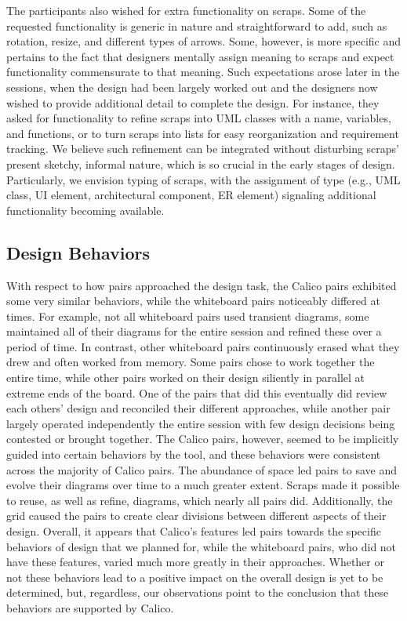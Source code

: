 The participants also wished for extra functionality on scraps. Some of the requested functionality is generic in nature and straightforward to add, such as rotation, resize, and different types of arrows. Some, however, is more specific and pertains to the fact that designers mentally assign meaning to scraps and expect functionality commensurate to that meaning. Such expectations arose later in the sessions, when the design had been largely worked out and the designers now wished to provide additional detail to complete the design. For instance, they asked for functionality to refine scraps into UML classes with a name, variables, and functions, or to turn scraps into lists for easy reorganization and requirement tracking. We believe such refinement can be integrated without disturbing scraps' present sketchy, informal nature, which is so crucial in the early stages of design. Particularly, we envision typing of scraps, with the assignment of type (e.g., UML class, UI element, architectural component, ER element) signaling additional functionality becoming available. 

\subsection {Design Behaviors}
\label{discussion:2}

With respect to how pairs approached the design task, the Calico pairs exhibited some very similar behaviors, while the whiteboard pairs noticeably differed at times. For example, not all whiteboard pairs used transient diagrams, some maintained all of their diagrams for the entire session and refined these over a period of time. In contrast, other whiteboard pairs continuously erased what they drew and often worked from memory. Some pairs chose to work together the entire time, while other pairs worked on their design siliently in parallel at extreme ends of the board. One of the pairs that did this eventually did review each others' design and reconciled their different approaches, while another pair largely operated independently the entire session with few design decisions being contested or brought together. The Calico pairs, however, seemed to be implicitly guided into certain behaviors by the tool, and these behaviors were consistent across the majority of Calico pairs. The abundance of space led pairs to save and evolve their diagrams over time to a much greater extent. Scraps made it possible to reuse, as well as refine, diagrams, which nearly all pairs did. Additionally, the grid caused the pairs to create clear divisions between different aspects of their design. Overall, it appears that Calico's features led pairs towards the specific behaviors of design that we planned for, while the whiteboard pairs, who did not have these features, varied much more greatly in their approaches. Whether or not these behaviors lead to a positive impact on the overall design is yet to be determined, but, regardless, our observations point to the conclusion that these behaviors are supported by Calico.

